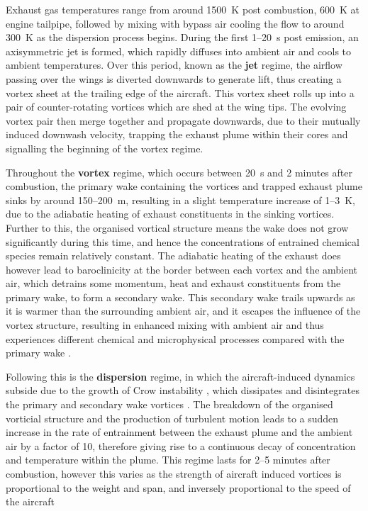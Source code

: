 Exhaust gas temperatures range from around 1500~K post combustion, 600~K at engine tailpipe, followed by mixing with bypass air cooling the flow to around 300~K \cite{Brasseur1998} as the dispersion process begins. During the first 1--20~s post emission, an axisymmetric jet is formed, which rapidly diffuses into ambient air and cools to ambient temperatures. Over this period, known as the \textbf{jet} regime, the airflow passing over the wings is diverted downwards to generate lift, thus creating a vortex sheet at the trailing edge of the aircraft. This vortex sheet rolls up into a pair of counter-rotating vortices which are shed at the wing tips. The evolving vortex pair then merge together and propagate downwards, due to their mutually induced downwash velocity, trapping the exhaust plume within their cores and signalling the beginning of the vortex regime.

Throughout the \textbf{vortex} regime, which occurs between 20~s and 2 minutes after combustion, the primary wake containing the vortices and trapped exhaust plume sinks by around 150--200~m, resulting in a slight temperature increase of 1--3~K, due to the adiabatic heating of exhaust constituents in the sinking vortices. Further to this, the organised vortical structure means the wake does not grow significantly during this time, and hence the concentrations of entrained chemical species remain relatively constant. The adiabatic heating of the exhaust does however lead to baroclinicity at the border between each vortex and the ambient air, which detrains some momentum, heat and exhaust constituents from the primary wake, to form a secondary wake. This secondary wake trails upwards as it is warmer than the surrounding ambient air, and it escapes the influence of the vortex structure, resulting in enhanced mixing with ambient air and thus experiences different chemical and microphysical processes compared with the primary wake \cite{Gerz1998}.

Following this is the \textbf{dispersion} regime, in which the aircraft-induced dynamics subside due to the growth of Crow instability \cite{Crow1970}, which dissipates and disintegrates the primary and secondary wake vortices \cite{Paoli2016}. The breakdown of the organised vorticial structure and the production of turbulent motion leads to a sudden increase in the rate of entrainment between the exhaust plume and the ambient air by a factor of 10, therefore giving rise to a continuous decay of concentration and temperature within the plume. This regime lasts for 2--5 minutes after combustion, however this varies as the strength of aircraft induced vortices is proportional to the weight and span, and inversely proportional to the speed of the aircraft \cite{Gerz1998}

